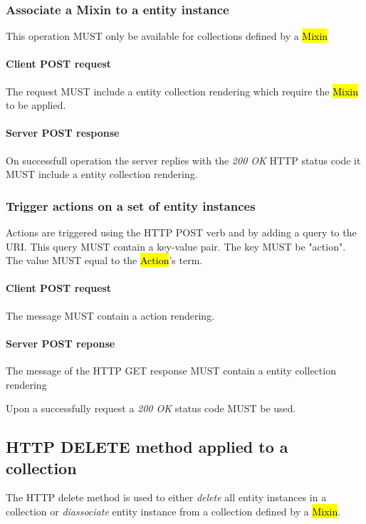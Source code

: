 \documentclass[10pt,a4paper]{article}
\begin{document}
\subsubsection{Associate a Mixin to a entity instance}
This operation MUST only be available for collections defined by a \hl{Mixin}

\paragraph{Client POST request}
The request MUST include a entity collection rendering which require the \hl{Mixin} to be applied.

\paragraph{Server POST response}
On successfull operation the server replies with the \emph{200 OK} HTTP status code it MUST include a entity collection rendering.

\subsubsection{Trigger actions on a set of entity instances}
Actions are triggered using the HTTP POST verb and by adding a query to the URI. This query MUST contain a key-value pair. The key MUST be "action". The value MUST equal to the \hl{Action}'s term.

\paragraph{Client POST request}
The message MUST contain a action rendering.

\paragraph{Server POST reponse}
The message of the HTTP GET response MUST contain a entity collection rendering

Upon a successfully request a \emph{200 OK} status code MUST be used.

\subsection{HTTP DELETE method applied to a collection}
The HTTP delete method is used to either {\em delete} all entity instances in a collection or {\em diassociate} entity instance from a collection defined by a \hl{Mixin}.
\end{document}
